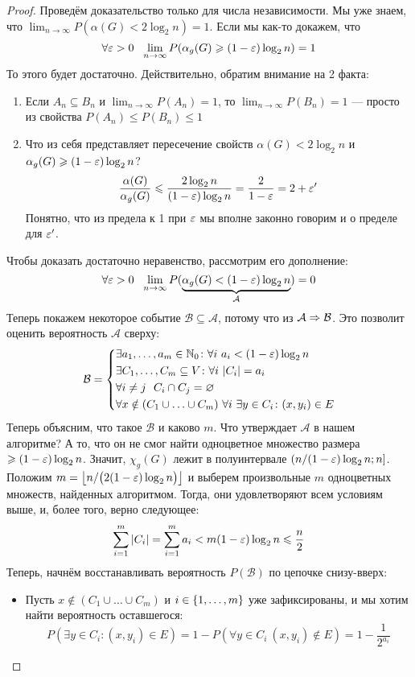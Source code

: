 \begin{proof}
	Проведём доказательство только для числа независимости. Мы уже знаем, что $\lim_{n \to \infty} P(\alpha(G) < 2\log_2 n) = 1$. Если мы как-то докажем, что
	\[
		\forall \varepsilon > 0\ \ \lim_{n \to \infty} P(\alpha_g(G) \geqslant (1 - \varepsilon)\log_2 n) = 1
	\]
	То этого будет достаточно. Действительно, обратим внимание на 2 факта:
	\begin{enumerate}
		\item Если $A_n \subseteq B_n$ и $\lim_{n \to \infty} P(A_n) = 1$, то $\lim_{n \to \infty} P(B_n) = 1$ --- просто из свойства $P(A_n) \le P(B_n) \le 1$
		
		\item Что из себя представляет пересечение свойств $\alpha(G) < 2\log_2 n$ и $\alpha_g(G) \geqslant (1 - \varepsilon)\log_2 n$?
		\[
			\frac{\alpha(G)}{\alpha_g(G)} \leqslant \frac{2\log_2 n}{(1 - \varepsilon)\log_2 n} = \frac{2}{1 - \varepsilon} = 2 + \varepsilon'
		\]
		Понятно, что из предела к 1 при $\varepsilon$ мы вполне законно говорим и о пределе для $\varepsilon'$.
	\end{enumerate}
	Чтобы доказать достаточно неравенство, рассмотрим его дополнение:
	\[
		\forall \varepsilon > 0\ \ \lim_{n \to \infty} P(\underbrace{\alpha_g(G) < (1 - \varepsilon)\log_2 n}_{\mathcal{A}}) = 0
	\]
	Теперь покажем некоторое событие $\mathcal{B} \subseteq \mathcal{A}$, потому что из $\mathcal{A} \Rightarrow \mathcal{B}$. Это позволит оценить вероятность $\mathcal{A}$ сверху:
	\[
		\mathcal{B} = \System{
			&{\exists a_1, \ldots, a_m \in \N_0 \colon \forall i\ a_i < (1 - \eps)\log_2 n}
			\\
			&{\exists C_1, \ldots, C_m \subseteq V \colon \forall i\ |C_i| = a_i}
			\\
			&{\forall i \neq j\ \ C_i \cap C_j = \emptyset}
			\\
			&{\forall x \notin (C_1 \cup \ldots \cup C_m)\ \forall i\ \exists y \in C_i \colon (x, y_i) \in E}
		}
	\]
	Теперь объясним, что такое $\mathcal{B}$ и каково $m$. Что утверждает $\mathcal{A}$ в нашем алгоритме? А то, что он не смог найти одноцветное множество размера $\geqslant (1 - \varepsilon)\log_2 n$. Значит, $\chi_g(G)$ лежит в полуинтервале $(n / (1 - \varepsilon)\log_2 n; n]$. Положим $m = \left\lfloor n / \big(2(1 - \varepsilon)\log_2 n\big) \right\rfloor$ и выберем произвольные $m$ одноцветных множеств, найденных алгоритмом. Тогда, они удовлетворяют всем условиям выше, и, более того, верно следующее:
	\[
		\sum_{i = 1}^m |C_i| = \sum_{i = 1}^m a_i < m (1 - \varepsilon)\log_2 n \leqslant \frac{n}{2}
	\]
	Теперь, начнём восстанавливать вероятность $P(\mathcal{B})$ по цепочке снизу-вверх:
	\begin{itemize}
		\item Пусть $x \notin (C_1 \cup \ldots \cup C_m)$ и $i \in \{1, \ldots, m\}$ уже зафиксированы, и мы хотим найти вероятность оставшегося:
		\[
			P(\exists y \in C_i \colon (x, y_i) \in E) = 1 - P(\forall y \in C_i\ (x, y_i) \notin E) = 1 - \frac{1}{2^{a_i}}
		\]
		

\end{itemize}
\end{proof}
